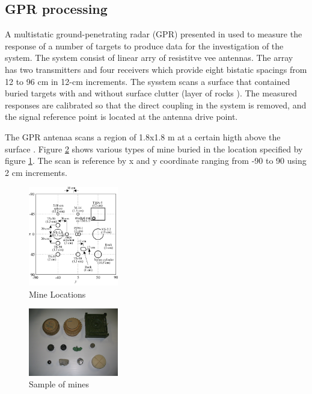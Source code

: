 \documentclass[conference]{IEEEtran}
\begin{document}
\subsection{GPR processing}

A multistatic ground-penetrating radar (GPR) presented in \cite{Counts2007} used to measure the response of a
number of targets to produce data for the investigation of  the system. The system consist of linear arry of resistitve vee antennas. The array has two transmitters and four receivers which provide eight bistatic spacings from 12 to 96 cm in 12-cm increments. The sysstem scans a surface that contained buried targets with and without surface clutter (layer of rocks ).  The measured responses are calibrated so that the direct coupling in the system is removed, and the signal reference point is located at the antenna drive point.

The GPR antenaa scans a region of  1.8x1.8 m  at a certain higth above the surface \cite{Counts2007}. Figure \ref{fig:mineshapes} shows various types of mine buried in the location specified by figure \ref{fig:minloc}. The scan is reference by x and y coordinate ranging from -90 to 90 using 2 cm increments.

 \begin{figure}
\centering
\label{fig:minloc}
\includegraphics[width=0.35\textwidth]{images/MineLocations.jpg}
 \caption{Mine Locations}
\end{figure}

 \begin{figure}
\centering
\label{fig:mineshapes}
\includegraphics[width=0.35\textwidth]{images/MineShapes.jpg}
 \caption{ Sample of mines  }
\end{figure}
\end{document}
